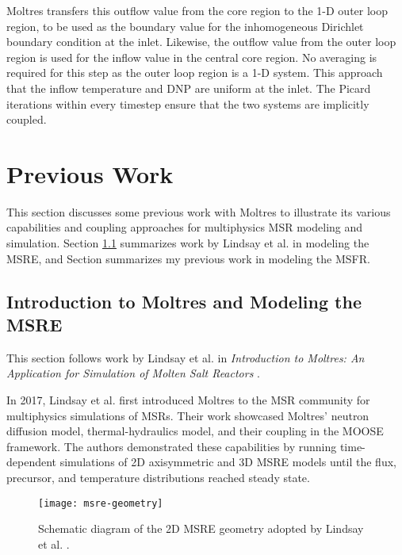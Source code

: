 Moltres transfers this outflow value from the core region to the 1-D
outer loop region, to be used as the boundary value for the inhomogeneous
Dirichlet boundary
condition at the inlet. Likewise, the outflow value from the outer
loop region is used for the inflow value in the central core region. No
averaging is required for this step as the outer loop region is a 1-D system.
This approach that the inflow temperature and \gls{DNP} are uniform at the
inlet. The Picard iterations within every timestep ensure that the two systems
are implicitly coupled.

\section{Previous Work} \label{sec:moltres-previous}

This section discusses some previous work with Moltres to illustrate its
various capabilities and coupling approaches for multiphysics \gls{MSR}
modeling and simulation. Section \ref{sec:msre} summarizes work by Lindsay et
al. \cite{lindsay_introduction_2018} in modeling the \gls{MSRE}, and Section
\cite{park_advancement_2020} summarizes my previous work in modeling the
\gls{MSFR}.

\subsection{Introduction to Moltres and Modeling the MSRE} \label{sec:msre}

This section follows work by Lindsay et al. in \textit{Introduction to Moltres:
An Application for Simulation of Molten Salt Reactors}
\cite{lindsay_introduction_2018}.

In 2017, Lindsay et al. first introduced
Moltres to the \gls{MSR} community for multiphysics simulations of \glspl{MSR}.
Their work showcased Moltres' neutron diffusion model, thermal-hydraulics
model, and their coupling in the \gls{MOOSE} framework. The authors
demonstrated these capabilities by running time-dependent simulations of 2D
axisymmetric and 3D \gls{MSRE} models until the flux, precursor, and
temperature distributions reached steady state.

\begin{figure}[htb!]
	\centering
	\texttt{[image: msre-geometry]}
	\caption{Schematic diagram of the 2D \gls{MSRE} geometry adopted by
	Lindsay et al. \cite{lindsay_introduction_2018}.}
	\label{fig:msre-geometry}
\end{figure}

